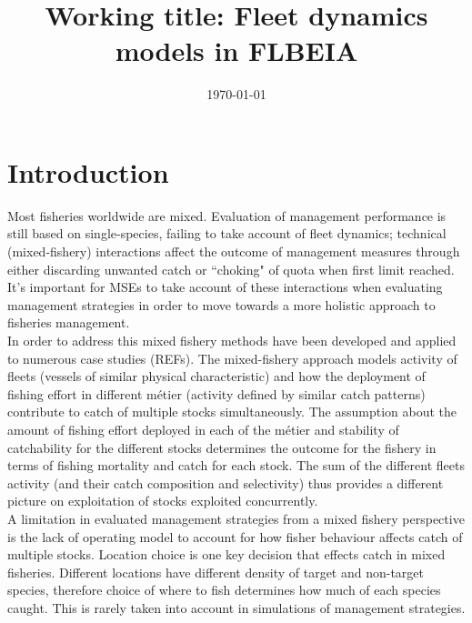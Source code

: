 \documentclass[12pt, halfline, a4paper]{ouparticle}
\begin{document}
\title{Working title: Fleet dynamics models in FLBEIA}

\author{
	\address{GMIT}
	\address{CEFAS}
	\and
	\address{GMIT}
	\and
	\address{AZTI}
}


\date{\today}


\maketitle

\section{Introduction}
\label{intro}

Most fisheries worldwide are mixed. Evaluation of management performance is
still based on single-species, failing to take account of fleet dynamics;
technical (mixed-fishery) interactions affect the outcome of management
measures through either discarding unwanted catch or ``choking" of quota when
first limit reached. It's important for MSEs to take account of these
interactions when evaluating management strategies in order to move towards a
more holistic approach to fisheries management.  \\

In order to address this mixed fishery methods have been developed and applied
to numerous case studies (REFs). The mixed-fishery approach models activity of
fleets (vessels of similar physical characteristic) and how the deployment of
fishing effort in different métier (activity defined by similar catch patterns)
contribute to catch of multiple stocks simultaneously. The assumption about the
amount of fishing effort deployed in each of the métier and stability of
catchability for the different stocks determines the outcome for the fishery in
terms of fishing mortality and catch for each stock. The sum of the different
fleets activity (and their catch composition and selectivity) thus provides a
different picture on exploitation of stocks exploited concurrently. \\ 

A limitation in evaluated management strategies from a mixed fishery
perspective is the lack of operating model to account for how fisher behaviour
affects catch of multiple stocks. Location choice is one key decision that
effects catch in mixed fisheries. Different locations have different density of
target and non-target species, therefore choice of where to fish determines how
much of each species caught. This is rarely taken into account in simulations
of management strategies.\\
\end{document}
